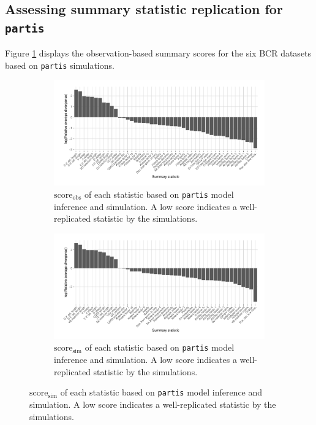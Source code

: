 \documentclass{article}
\begin{document}
\subsection*{Assessing summary statistic replication for \texttt{partis}}
Figure \ref{fig:ObsScoresBCR} displays the observation-based summary scores for the six BCR datasets based on \texttt{partis} simulations.
\begin{figure}
	\begin{subfigure}{\textwidth}
    	\includegraphics[width=\linewidth]{Figures/PartisScores/obs_score_plot.pdf}
    	\caption{$\text{score}_\text{obs}$ of each statistic based on \texttt{partis} model inference and simulation.
     	   A low score indicates a well-replicated statistic by the simulations.
    	}
    	\label{fig:ObsScoresBCR}
	\end{subfigure}
	\begin{subfigure}{\textwidth}
    	\includegraphics[width=\linewidth]{Figures/PartisScores/sim_score_plot.pdf}
    	\caption{$\text{score}_\text{sim}$ of each statistic based on \texttt{partis} model inference and simulation.
    	    A low score indicates a well-replicated statistic by the simulations.
    	}
    	\label{fig:SimScoresBCR}
	\end{subfigure}
\end{figure}
\end{document}
